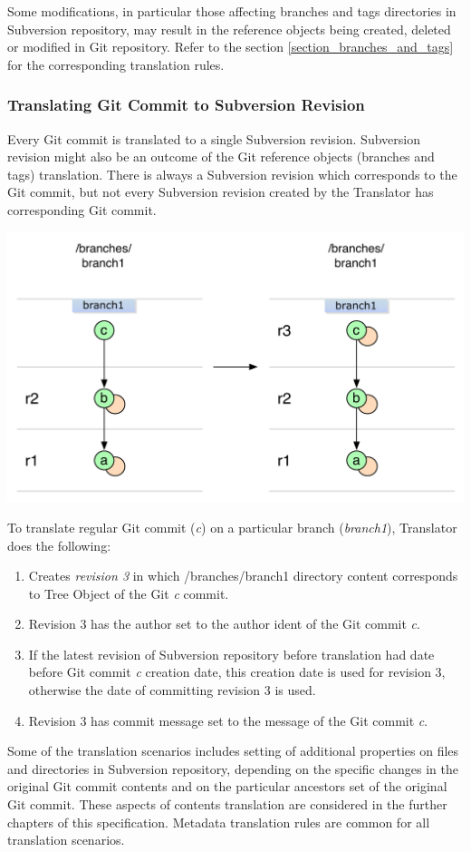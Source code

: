Some modifications, in particular those affecting branches and tags directories in Subversion repository, may
result in the reference objects being created, deleted or modified in Git repository. Refer to the section \ref{section_branches_and_tags} for the corresponding translation rules.

\subsubsection{Translating Git Commit to Subversion Revision}
Every Git commit is translated to a single Subversion revision. Subversion revision might also be an outcome of 
the Git reference objects (branches and tags) translation. There is always a Subversion revision
which corresponds to the Git commit, but not every Subversion revision created by the Translator has 
corresponding Git commit.
\begin{center}
\includegraphics[width=\textwidth]{img/diagrams/single_change_git_to_svn.pdf}%
\label{single_change_git_to_svn}%
\end{center}

To translate regular Git commit (\emph{c}) on a particular branch (\emph{branch1}), Translator does 
the following:
\begin{enumerate}
	\compactlist
	\item Creates \emph{revision 3} in which /branches/branch1 directory content corresponds to Tree Object of the Git \emph{c} commit.
	\item Revision 3 has the author set to the author ident of the Git commit \emph{c}.
	\item If the latest revision of Subversion repository before translation had date before Git commit \emph{c} creation date, this creation date is used for revision 3, otherwise the date of committing revision 3 is used.
	\item Revision 3 has commit message set to the message of the Git commit \emph{c}.
\end{enumerate}

Some of the translation scenarios includes setting of additional properties on files and directories 
in Subversion repository, depending on the specific changes in the original Git commit contents and 
on the particular ancestors set of the original Git commit. These aspects of contents translation are considered in the further chapters of
this specification. Metadata translation rules are common for all translation scenarios.